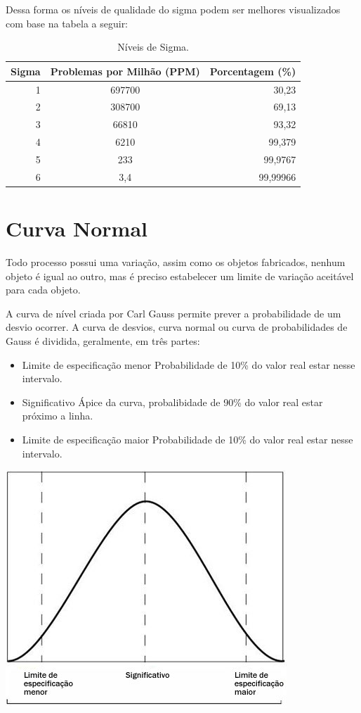 \documentclass{abnt}
\begin{document}
			Dessa forma os níveis de qualidade do sigma podem ser melhores visualizados com base na tabela a seguir:
			\begin{table}[h]
				\centering

				\begin{tabular}{rcr}
					\toprule
					Sigma & Problemas por Milhão (PPM) & Porcentagem (\%) \\
					\midrule
					 1 & 697700	& 30,23 	\\
					 2 & 308700 & 69,13 	\\
					 3 & 66810 	& 93,32 	\\
					 4 & 6210 	& 99,379 	\\
					 5 & 233 	& 99,9767 	\\
					 6 & 3,4 	& 99,99966 	\\
					\bottomrule		
				\end{tabular}
	
				\label{tab_niveisSigma}
				\caption{Níveis de Sigma.}
				
			\end{table}

		\section {Curva Normal} 
			Todo processo possui uma variação, assim como os objetos fabricados, nenhum objeto é igual ao outro, mas é preciso estabelecer um limite de variação aceitável para cada objeto.
			
			A curva de nível criada por Carl Gauss permite prever a probabilidade de um desvio ocorrer. A curva de desvios, curva normal ou curva de probabilidades de Gauss é dividida, geralmente, em três partes:
			\begin{itemize}
				\item {Limite de especificação menor}
					\subitem Probabilidade de 10\% do valor real estar nesse intervalo. 
				\item {Significativo}
					\subitem Ápice da curva, probalibidade de 90\% do valor real estar próximo a linha. 
				\item {Limite de especificação maior}
					\subitem Probabilidade de 10\% do valor real estar nesse intervalo.
			\end{itemize}
			
			\includegraphics{img/curva.jpg}
		    
\end{document}
